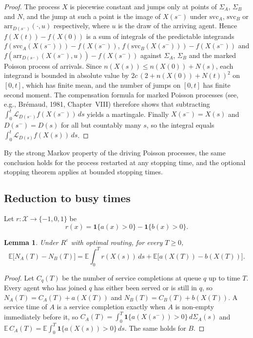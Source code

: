 \documentclass[11pt]{article}
\newtheorem{blem}[bthm]{Lemma}
\theoremstyle{definition}
\theoremstyle{remark}
\newcommand{\E}{\mathbb{E}}
\newcommand{\ind}{\mathbf{1}}
\newcommand{\cX}{\mathcal{X}}
\newcommand{\cL}{\mathcal{L}}
\newcommand{\Reps}{R^{\varepsilon}}
\newcommand{\SvA}{\Sigma_A}
\newcommand{\SvB}{\Sigma_B}
\begin{document}
\begin{proof}
The process $X$ is piecewise constant and jumps only at points of $\SvA$,
$\SvB$ and $N$, and the jump at such a point is the image of $X(s^-)$ under
$\mathrm{svc}_A$, $\mathrm{svc}_B$ or $\mathrm{arr}_{D(s^-)}(\cdot,u)$
respectively, where $u$ is the draw of the arriving agent. Hence
$f(X(t))-f(X(0))$ is a sum of integrals of the predictable integrands
$f(\mathrm{svc}_A(X(s^-)))-f(X(s^-))$, $f(\mathrm{svc}_B(X(s^-)))-f(X(s^-))$ and
$f(\mathrm{arr}_{D(s^-)}(X(s^-),u))-f(X(s^-))$ against $\SvA$, $\SvB$ and the
marked Poisson process of arrivals. Since $n(X(s))\le n(X(0))+N(s)$, each
integrand is bounded in absolute value by $2c\,(2+n(X(0))+N(t))^{2}$ on
$[0,t]$, which has finite mean, and the number of jumps on $[0,t]$ has finite second moment. The
compensation formula for marked Poisson processes (see, e.g.,
Br\'emaud, 1981, Chapter~VIII) therefore shows that subtracting
$\int_0^t\cL_{D(s^-)}f(X(s^-))\,ds$ yields a martingale. Finally $X(s^-)=X(s)$
and $D(s^-)=D(s)$ for all but countably many $s$, so the integral equals
$\int_0^t\cL_{D(s)}f(X(s))\,ds$.
\end{proof}

By the strong Markov property of the driving Poisson processes, the same
conclusion holds for the process restarted at any stopping time, and the
optional stopping theorem applies at bounded stopping times.

\subsection{Reduction to busy times}

Let $r:\cX\to\{-1,0,1\}$ be
\[
  r(x)=\ind\{a(x)>0\}-\ind\{b(x)>0\}.
\]

\begin{blem}\label{lem:busy}
Under $\Reps$ with optimal routing, for every $T\ge0$,
\[
  \E\bigl[N_A(T)-N_B(T)\bigr]
  =\E\int_0^T r(X(s))\,ds+\E\bigl[a(X(T))-b(X(T))\bigr].
\]
\end{blem}

\begin{proof}
Let $C_q(T)$ be the number of service completions at queue $q$ up to time $T$.
Every agent who has joined $q$ has either been served or is still in $q$, so
$N_A(T)=C_A(T)+a(X(T))$ and $N_B(T)=C_B(T)+b(X(T))$. A service time of $A$ is a
service completion exactly when $A$ is non-empty immediately before it, so
$C_A(T)=\int_0^T\ind\{a(X(s^-))>0\}\,d\SvA(s)$ and
$\E\,C_A(T)=\E\int_0^T\ind\{a(X(s))>0\}\,ds$. The same holds for $B$.
\end{proof}
\end{document}
